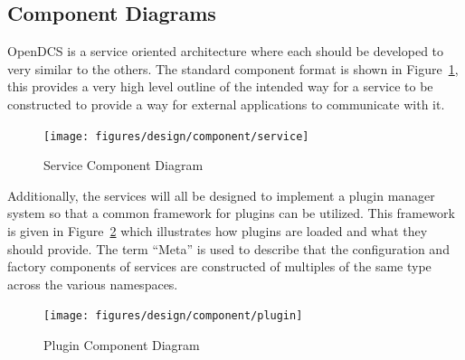   \newpage

  \subsection{Component Diagrams}\label{sec:dsg-component}

    OpenDCS is a service oriented architecture where each should be developed to
    very similar to the others. The standard component format is shown in
    Figure~\ref{fig:dsg-component-service}, this provides a very high level
    outline of the intended way for a service to be constructed to provide a way
    for external applications to communicate with it.

    \begin{figure}[H]
      \texttt{[image: figures/design/component/service]}
      \caption{Service Component Diagram}
      \label{fig:dsg-component-service}
    \end{figure}

    Additionally, the services will all be designed to implement a plugin
    manager system so that a common framework for plugins can be utilized. This
    framework is given in Figure~\ref{fig:dsg-component-plugin} which
    illustrates how plugins are loaded and what they should provide. The term
    ``Meta'' is used to describe that the configuration and factory components
    of services are constructed of multiples of the same type across the various
    namespaces.

    \begin{figure}[H]
      \texttt{[image: figures/design/component/plugin]}
      \caption{Plugin Component Diagram}
      \label{fig:dsg-component-plugin}
    \end{figure}
